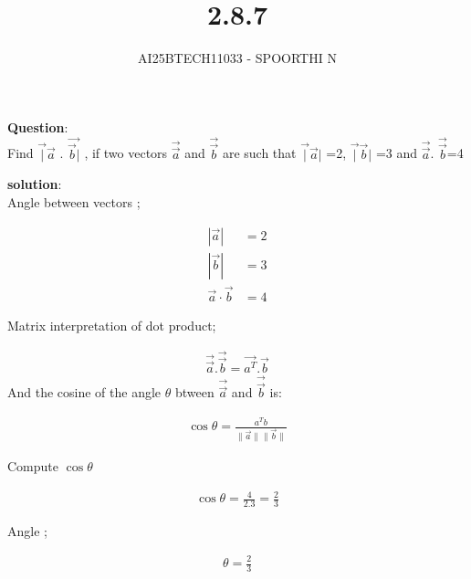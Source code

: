 \documentclass[journal,12pt,onecolumn]{IEEEtran}
\begin{document}
\title{2.8.7}
\author{AI25BTECH11033 - SPOORTHI N}
{\let\newpage\relax\maketitle}

\textbf{Question}:\\

\noindent Find $\overrightarrow|{\vec{a}}$ . $\overrightarrow{\vec{b}|}$ , if two vectors 
$\overrightarrow{\vec{a}}$ and $\overrightarrow{\vec{b}}$ are such that $\overrightarrow|{\vec{a}|}$ =2, $\overrightarrow|{\vec{b}|}$ =3 and $\overrightarrow{\vec{a}}$. 
$\overrightarrow{\vec{b}}$=4 

\textbf{solution}:\\


Angle between vectors ;

\begin{align}
 |\vec{a}| &= 2 \\
|\vec{b}| &= 3 \\
\vec{a} \cdot \vec{b} &= 4
\end{align}

Matrix interpretation of dot product;

\begin{align}
    \overrightarrow{\vec{a}}. \overrightarrow{\vec{b}} = \overrightarrow{{a^T}} . \overrightarrow{{b}} 
\end{align}
And the cosine of the angle $\theta$ btween $\overrightarrow{\vec{a}}$ and $\overrightarrow{\vec{b}}$ is:

\begin{align}
   \cos \theta=\frac{a^T b}{\|\vec{a}\|\|\vec{b}\|}
\end{align}

Compute $\cos \theta$

\begin{align}
       \cos \theta=\frac{4}{2.3}=\frac{2}{3}
\end{align}

Angle ;

\begin{align}
\theta=\frac{2}{3}
\end{align}
\end{document}
